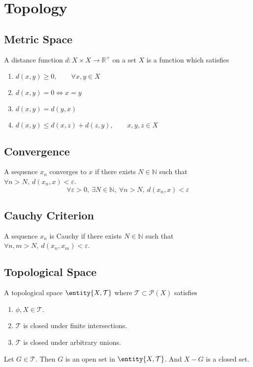 \section{Topology}
\subsection{Metric Space}
\begin{definition}
	A distance function $d : X \times X \to \mathbb{R}^+$ on a set $X$ is a function which satisfies
	\begin{enumerate}
		\item $d(x,y) \ge 0,\qquad \forall x,y \in X$
		\item $d(x,y) = 0 \iff x=y$
		\item $d(x,y) = d(y,x)$
		\item $d(x,y) \le d(x,z) + d(z,y), \qquad x,y,z \in X$
	\end{enumerate}
\end{definition}

\subsection{Convergence}
\begin{definition}[metric]
	A sequence $x_n$ converges to $x$ if there exists $N \in \mathbb{N}$ such that $\forall n > N,\ d(x_n,x) < \varepsilon$.
\begin{equation}
	\forall \varepsilon > 0,\ \exists N \in \mathbb{N},\ \forall n > N,\ d(x_n,x) < \varepsilon
\end{equation}
\end{definition}

\subsection{Cauchy Criterion}
\begin{definition}[metric]
	A sequence $x_n$ is Cauchy if there exists $N \in \mathbb{N}$ such that $\forall n,m > N,\ d(x_n,x_m) < \varepsilon$.
\end{definition}

\subsection{Topological Space}
\begin{definition}
	A topological space $\entity{X,\mathcal{T}}$ where $\mathcal{T} \subset \mathcal{P}(X)$ satisfies
	\begin{enumerate}
		\item $\phi,X \in \mathcal{T}$.
		\item $\mathcal{T}$ is closed under finite intersections.
		\item $\mathcal{T}$ is closed under arbitrary unions.
	\end{enumerate}
	Let $G \in \mathcal{T}$.
	Then $G$ is an open set in $\entity{X,\mathcal{T}}$.
	And $X-G$ is a closed set.
\end{definition}

